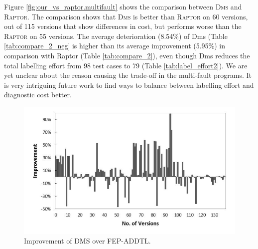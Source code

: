 \vspace{0.2cm}
Figure \ref{fig:our_vs_raptor.multifault} shows the comparison between \textsc{Dms} and \textsc{Raptor}. The comparison shows that \textsc{Dms} is better than \textsc{Raptor} on 60 versions, out of 115 versions that show differences in cost, 
but performs worse than the \textsc{Raptor} on 55 versions.
The average deterioration (8.54\%) of {\sc Dms} (Table \ref{tab:compare_2_neg} is higher than its average improvement (5.95\%) in comparison with {\sc Raptor} (Table \ref{tab:compare_2}), even though {\sc Dms} reduces the total labelling effort from 98 test cases to 79 (Table \ref{tab:label_effort2}). We are yet unclear about the reason causing the trade-off in the multi-fault programs. It is very intriguing future work to find ways to balance between labelling effort and diagnostic cost better.


\begin{figure}[tbp]
    \centering
    \includegraphics[width=12cm]{mut-dms-feq.pdf}
\caption{Improvement of D{\scriptsize MS} over F{\scriptsize EP}-A{\scriptsize DDTL}.}
    \label{fig:our_vs_fep.multifault}
\end{figure}



